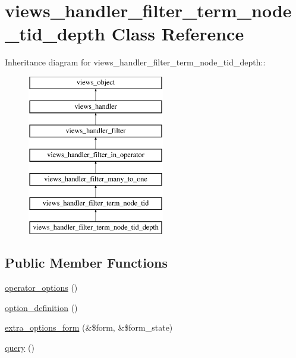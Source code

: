 \hypertarget{classviews__handler__filter__term__node__tid__depth}{
\section{views\_\-handler\_\-filter\_\-term\_\-node\_\-tid\_\-depth Class Reference}
\label{classviews__handler__filter__term__node__tid__depth}
}
Inheritance diagram for views\_\-handler\_\-filter\_\-term\_\-node\_\-tid\_\-depth::\begin{figure}[H]
\begin{center}
\leavevmode
\includegraphics[height=7cm]{classviews__handler__filter__term__node__tid__depth}
\end{center}
\end{figure}
\subsection*{Public Member Functions}
\begin{CompactItemize}
\item 
\hyperlink{classviews__handler__filter__term__node__tid__depth_fb7fceb94e0b622039906c0d97d64f4d}{operator\_\-options} ()
\item 
\hyperlink{classviews__handler__filter__term__node__tid__depth_e0822209bc155abaec93555bbeb93e78}{option\_\-definition} ()
\item 
\hyperlink{classviews__handler__filter__term__node__tid__depth_704c5e42a5a41ee12bd01b1b153431e4}{extra\_\-options\_\-form} (\&\$form, \&\$form\_\-state)
\item 
\hyperlink{classviews__handler__filter__term__node__tid__depth_ff1d2c0057597790a56bffd0674f391a}{query} ()
\end{CompactItemize}


